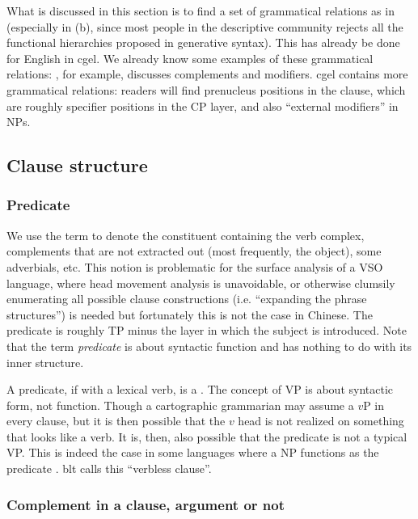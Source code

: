 \documentclass[../main.tex]{subfiles}
\begin{document}
What is discussed in this section is to find a set of grammatical relations 
as in  (especially in (b), 
since most people in the descriptive community rejects 
all the functional hierarchies proposed in generative syntax).
This has already be done for English in \ac{cgel}. 
We already know some examples of these grammatical relations: 
, for example, discusses complements and modifiers.
\ac{cgel} contains more grammatical relations: 
readers will find prenucleus positions in the clause, 
which are roughly specifier positions in the CP layer,
and also ``external modifiers'' in NPs. %

\subsection{Clause structure}

\subsubsection{Predicate}

We use the term  to denote the constituent containing the verb complex, 
complements that are not extracted out (most frequently, the object), some adverbials, etc.
This notion is problematic for the surface analysis of a VSO language, 
where head movement analysis is unavoidable, 
or otherwise clumsily enumerating all possible clause constructions 
(i.e. ``expanding the phrase structures'') is needed
but fortunately this is not the case in Chinese. 
The predicate is roughly TP minus the layer in which the subject is introduced. 
Note that the term \emph{predicate} is about syntactic function 
and has nothing to do with its inner structure.

A predicate, if with a lexical verb, is a .
The concept of VP is about syntactic form, not function. 
Though a cartographic grammarian may assume a $v$P in every clause, 
but it is then possible that the $v$ head is not realized on something that looks like a verb. 
It is, then, also possible that the predicate is not a typical VP.
This is indeed the case in some languages where a NP functions as the predicate \citep[]{Friesen2017}.
\ac{blt} calls this ``verbless clause''.

\subsubsection{Complement in a clause, argument or not}\label{sec:complement-argument-clause}
\end{document}
